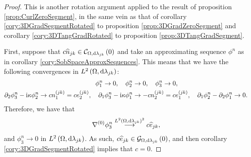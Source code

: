 \begin{proof}
	This is another rotation argument applied to the result of proposition \ref{prop:CurlZeroSegment}, in the same vein as that of corollary \ref{cory:3DGradSegmentRotated} to proposition \ref{prop:3DGradZeroSegment} and corollary \ref{cory:3DTangGradRotated} to proposition \ref{prop:3DTangGradSegment}.
	
	First, suppose that $c\widehat{n}_{jk}\in\mathcal{C}_{ \Omega, \mathrm{d}\lambda_{jk}}\left( 0 \right)$ and take an approximating sequence $\phi^n$ as in corollary \ref{cory:SobSpaceApproxSequences}.
	This means that we have the following convergences in $L^{2}\left( \Omega,\mathrm{d}\lambda_{jk} \right)$:
	\begin{align*}
		\phi^n_1 \rightarrow 0, \quad
		\phi^n_2 &\rightarrow 0, \quad
		\phi^n_3 \rightarrow 0, \\
		\partial_2\phi^n_3 - \mathrm{i}\kappa\phi^n_2 \rightarrow c n_1^{(jk)} = c e_2^{(jk)}, \quad
		\partial_1\phi^n_3 - \mathrm{i}\kappa\phi^n_1 &\rightarrow -c n_2^{(jk)} = c e_1^{(jk)}, \quad
		\partial_1\phi^n_2 - \partial_2\phi^n_1 \rightarrow 0.
	\end{align*}
	Therefore, we have that
	\begin{align*}
		\nabla^{(0)}\phi^n_3 \overset{L^{2}\left( \Omega,\mathrm{d}\lambda_{jk} \right)^2}{\longrightarrow} c \widehat{e}_{jk},
	\end{align*}
	and $\phi^n_3\rightarrow 0$ in $L^{2}\left( \Omega,\mathrm{d}\lambda_{jk} \right)$.
	As such, $c\widehat{e}_{jk}\in\mathcal{G}_{ \Omega, \mathrm{d}\lambda_{jk}}\left( 0 \right)$, and then corollary \ref{cory:3DGradSegmentRotated} implies that $c=0$.
	

\end{proof}
